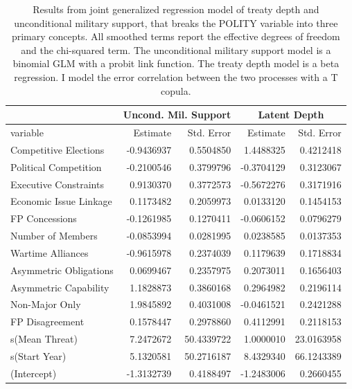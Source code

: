 \documentclass[12pt]{article}
\begin{document}
\begin{table}[ht]
\centering
\begin{tabular}{lrrrr}
  & \multicolumn{2}{c}{Uncond. Mil. Support} & \multicolumn{2}{c}{Latent Depth}\\ \hline
variable & Estimate & Std. Error & Estimate & Std. Error \\ 
  \hline
  Competitive Elections & -0.9436937 & 0.5504850 & 1.4488325 & 0.4212418 \\ 
  Political Competition & -0.2100546 & 0.3799796 & -0.3704129 & 0.3123067 \\ 
  Executive Constraints & 0.9130370 & 0.3772573 & -0.5672276 & 0.3171916 \\ 
  Economic Issue Linkage & 0.1173482 & 0.2059973 & 0.0133120 & 0.1454153 \\ 
  FP Concessions & -0.1261985 & 0.1270411 & -0.0606152 & 0.0796279 \\ 
  Number of Members & -0.0853994 & 0.0281995 & 0.0238585 & 0.0137353 \\ 
  Wartime Alliances & -0.9615978 & 0.2374039 & 0.1179639 & 0.1718834 \\ 
  Asymmetric Obligations & 0.0699467 & 0.2357975 & 0.2073011 & 0.1656403 \\ 
  Asymmetric Capability & 1.1828873 & 0.3860168 & 0.2964982 & 0.2196114 \\ 
  Non-Major Only & 1.9845892 & 0.4031008 & -0.0461521 & 0.2421288 \\ 
  FP Disagreement & 0.1578447 & 0.2978860 & 0.4112991 & 0.2118153 \\ 
  s(Mean Threat) & 7.2472672 & 50.4339722 & 1.0000010 & 23.0163958 \\ 
  s(Start Year) & 5.1320581 & 50.2716187 & 8.4329340 & 66.1243389 \\
  (Intercept) & -1.3132739 & 0.4188497 & -1.2483006 & 0.2660455 \\  
   \hline
\end{tabular}
\caption{Results from joint generalized regression model of treaty depth and unconditional military support, that breaks the POLITY variable into three primary concepts.  
                     All smoothed terms report the effective degrees of freedom and the chi-squared term. 
                     The unconditional military support model is a binomial GLM with a probit link function. 
                     The treaty depth model is a beta regression. 
                    I model the error correlation between the two processes with  a T copula.} 
\label{tab:gjrm-res-split}
\end{table}
\end{document}
